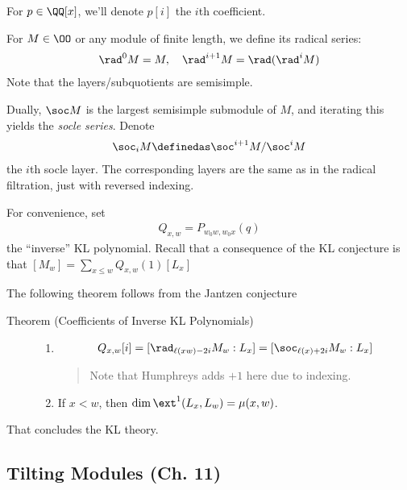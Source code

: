 For \(p\in \QQ[x]\), we'll denote \(p[i]\) the \(i\)th coefficient.

For \(M\in \OO\) or any module of finite length, we define its radical
series:
\begin{align*}\rad^0 M = M,\quad \rad^{i+1} M = \rad(\rad^i M)\end{align*}
Note that the layers/subquotients are semisimple.

Dually, \(\soc M\) is the largest semisimple submodule of \(M\), and
iterating this yields the \emph{socle series}. Denote
\begin{align*}\soc_i M \definedas \soc^{i+1} M / \soc^i M\end{align*}
the \(i\)th socle layer. The corresponding layers are the same as in the
radical filtration, just with reversed indexing.

For convenience, set
\begin{align*}Q_{x, w} = P_{w_0 w, w_0 x}(q)\end{align*} the ``inverse''
KL polynomial. Recall that a consequence of the KL conjecture is that
\([M_w] = \sum_{x\leq w} Q_{x, w}(1) [L_x]\)

The following theorem follows from the Jantzen conjecture

\begin{description}
\item[Theorem (Coefficients of Inverse KL Polynomials)]
\hfill

\begin{enumerate}
\def\labelenumi{\alph{enumi}.}
\item

  \begin{align*}Q_{x, w}[i] = [ \rad_{\ell(xw) - 2i} M_w : L_x] = [\soc_{\ell(x) + 2i} M_w: L_x]\end{align*}

  \begin{quote}
  Note that Humphreys adds \(+1\) here due to indexing.
  \end{quote}
\item
  If \(x < w\), then \(\dim \ext^1 (L_x, L_w) = \mu(x, w)\).
\end{enumerate}
\end{description}

That concludes the KL theory.

\hypertarget{tilting-modules-ch.-11}{%
\subsection{Tilting Modules (Ch. 11)}\label{tilting-modules-ch.-11}}

